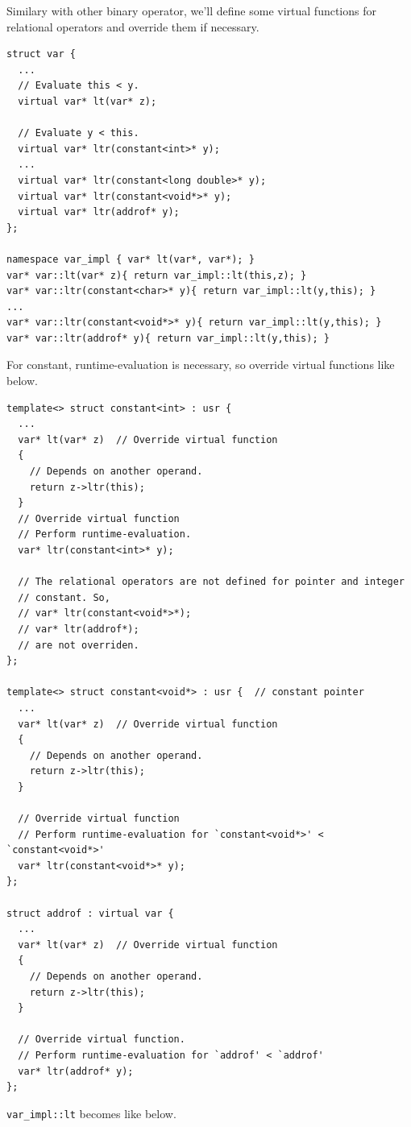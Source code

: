 Similary with other binary operator, we'll define some virtual
functions for relational operators and override them if necessary.
\begin{verbatim}
struct var {
  ...
  // Evaluate this < y.
  virtual var* lt(var* z);

  // Evaluate y < this.
  virtual var* ltr(constant<int>* y);
  ...
  virtual var* ltr(constant<long double>* y);
  virtual var* ltr(constant<void*>* y);
  virtual var* ltr(addrof* y);
};

namespace var_impl { var* lt(var*, var*); }
var* var::lt(var* z){ return var_impl::lt(this,z); }
var* var::ltr(constant<char>* y){ return var_impl::lt(y,this); }
...
var* var::ltr(constant<void*>* y){ return var_impl::lt(y,this); }
var* var::ltr(addrof* y){ return var_impl::lt(y,this); }
\end{verbatim}
For constant, runtime-evaluation is necessary, so override
virtual functions like below.
\begin{verbatim}
template<> struct constant<int> : usr {
  ...
  var* lt(var* z)  // Override virtual function
  {
    // Depends on another operand.
    return z->ltr(this);
  }
  // Override virtual function
  // Perform runtime-evaluation.
  var* ltr(constant<int>* y);

  // The relational operators are not defined for pointer and integer
  // constant. So,
  // var* ltr(constant<void*>*);
  // var* ltr(addrof*);
  // are not overriden.
};

template<> struct constant<void*> : usr {  // constant pointer
  ...
  var* lt(var* z)  // Override virtual function
  {
    // Depends on another operand.
    return z->ltr(this);
  }

  // Override virtual function
  // Perform runtime-evaluation for `constant<void*>' < `constant<void*>'
  var* ltr(constant<void*>* y);
};

struct addrof : virtual var {
  ...
  var* lt(var* z)  // Override virtual function
  {
    // Depends on another operand.
    return z->ltr(this);
  }

  // Override virtual function.
  // Perform runtime-evaluation for `addrof' < `addrof'
  var* ltr(addrof* y);
};
\end{verbatim}
{\tt{var\_impl::lt}} becomes like below.
